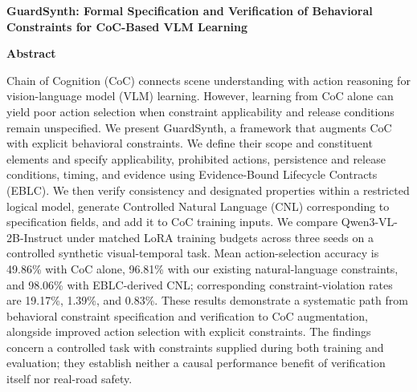 \documentclass[11pt,a4paper]{article}
\begin{document}
\vspace*{8mm}
{\Large\bfseries\color{navy} GuardSynth: Formal Specification and Verification of Behavioral Constraints for CoC-Based VLM Learning\par}
\vspace{8mm}
{\large\bfseries Abstract\par}
\vspace{3mm}
Chain of Cognition (CoC) connects scene understanding with action reasoning for vision-language model (VLM) learning. However, learning from CoC alone can yield poor action selection when constraint applicability and release conditions remain unspecified. We present GuardSynth, a framework that augments CoC with explicit behavioral constraints. We define their scope and constituent elements and specify applicability, prohibited actions, persistence and release conditions, timing, and evidence using Evidence-Bound Lifecycle Contracts (EBLC). We then verify consistency and designated properties within a restricted logical model, generate Controlled Natural Language (CNL) corresponding to specification fields, and add it to CoC training inputs. We compare Qwen3-VL-2B-Instruct under matched LoRA training budgets across three seeds on a controlled synthetic visual-temporal task. Mean action-selection accuracy is 49.86\% with CoC alone, 96.81\% with our existing natural-language constraints, and 98.06\% with EBLC-derived CNL; corresponding constraint-violation rates are 19.17\%, 1.39\%, and 0.83\%. These results demonstrate a systematic path from behavioral constraint specification and verification to CoC augmentation, alongside improved action selection with explicit constraints. The findings concern a controlled task with constraints supplied during both training and evaluation; they establish neither a causal performance benefit of verification itself nor real-road safety.
\end{document}
